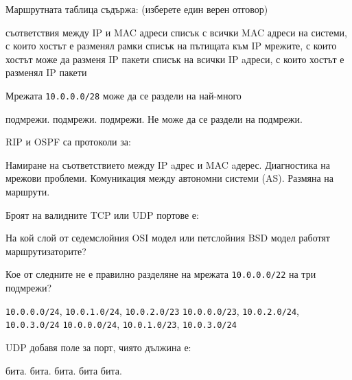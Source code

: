 \begin{questions}
  \question[6] Маршрутната таблица съдържа: (изберете един верен отговор)
  \begin{choices}
    \choice съответствия между IP и MAC адреси
    \choice списък с всички MAC адреси на системи, с които хостът е разменял
    рамки
    \CorrectChoice списък на пътищата към IP мрежите, с които хостът може да
    разменя IP пакети
    \choice списък на всички IP aдреси, с които хостът е разменял IP пакети
  \end{choices}

  \question[10] Мрежата \texttt{10.0.0.0/28} може да се раздели на най-много
  \begin{choices}
     подмрежи.
     подмрежи.
     подмрежи.
    \choice Не може да се раздели на подмрежи.
  \end{choices}

  \question[6] RIP и OSPF са протоколи за:
  \begin{choices}
    \choice Намиране на съответствието между IP aдрес и MAC aдерес.
    \choice Диагностика на мрежови проблеми.
    \choice Комуникация между автономни системи (AS).
    \CorrectChoice Размяна на маршрути.
  \end{choices}

  \question[6] Броят на валидните TCP или UDP портове е:
  \begin{oneparchoices}
  \end{oneparchoices}

  \question[6] На кой слой от седемслойния OSI модел или петслойния BSD модел
  работят маршрутизаторите?
  \begin{oneparchoices}
  \end{oneparchoices}

  \question[10] Кое от следните не е правилно разделяне на мрежата
  \texttt{10.0.0.0/22} на три подмрежи?


  \begin{choices}
    \choice \texttt{10.0.0.0/24}, \texttt{10.0.1.0/24}, \texttt{10.0.2.0/23}
    \choice \texttt{10.0.0.0/23}, \texttt{10.0.2.0/24}, \texttt{10.0.3.0/24}
    \CorrectChoice \texttt{10.0.0.0/24}, \texttt{10.0.1.0/23}, \texttt{10.0.3.0/24}
  \end{choices}

  \question[6] UDP добавя поле за порт, чиято дължина е:
  \begin{oneparchoices}
     бита.
     бита.
     бита.
     бита
     бита.
  \end{oneparchoices}



\end{questions}
